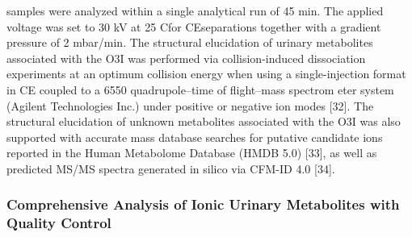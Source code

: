 \documentclass[journal=jacsat,manuscript=article]{achemso}
\begin{document}
samples were analyzed within a single analytical run of 45 min. The
applied voltage was set to 30 kV at 25 Cfor CEseparations together with
a gradient pressure of 2 mbar/min. The structural elucidation of urinary
metabolites associated with the O3I was performed via collision-induced
dissociation experiments at an optimum collision energy when using a
single-injection format in CE coupled to a 6550 quadrupole--time of
flight--mass spectrom eter system (Agilent Technologies Inc.) under
positive or negative ion modes {[}32{]}. The structural elucidation of
unknown metabolites associated with the O3I was also supported with
accurate mass database searches for putative candidate ions reported in
the Human Metabolome Database (HMDB 5.0) {[}33{]}, as well as predicted
MS/MS spectra generated in silico via CFM-ID 4.0 {[}34{]}.

\subsubsection{Comprehensive Analysis of Ionic Urinary Metabolites with
Quality
Control}\label{comprehensive-analysis-of-ionic-urinary-metabolites-with-quality-control}
\end{document}
